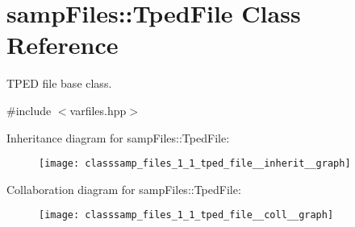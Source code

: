 \hypertarget{classsamp_files_1_1_tped_file}{}\section{samp\+Files\+:\+:Tped\+File Class Reference}
\label{classsamp_files_1_1_tped_file}


T\+P\+ED file base class.  




{\ttfamily \#include $<$varfiles.\+hpp$>$}



Inheritance diagram for samp\+Files\+:\+:Tped\+File\+:\nopagebreak
\begin{figure}[H]
\begin{center}
\leavevmode
\texttt{[image: classsamp\_files\_1\_1\_tped\_file\_\_inherit\_\_graph]}
\end{center}
\end{figure}


Collaboration diagram for samp\+Files\+:\+:Tped\+File\+:\nopagebreak
\begin{figure}[H]
\begin{center}
\leavevmode
\texttt{[image: classsamp\_files\_1\_1\_tped\_file\_\_coll\_\_graph]}
\end{center}
\end{figure}

